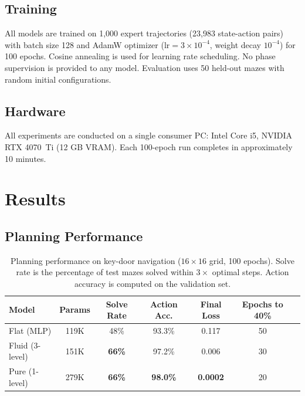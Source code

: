 \documentclass{article}
\begin{document}
\subsection{Training}

All models are trained on 1,000 expert trajectories (23,983 state-action pairs) with batch size 128 and AdamW optimizer ($\text{lr} = 3 \times 10^{-4}$, weight decay $10^{-4}$) for 100 epochs. Cosine annealing is used for learning rate scheduling. No phase supervision is provided to any model. Evaluation uses 50 held-out mazes with random initial configurations.

\subsection{Hardware}

All experiments are conducted on a single consumer PC: Intel Core i5, NVIDIA RTX 4070~Ti (12 GB VRAM). Each 100-epoch run completes in approximately 10 minutes.

\section{Results}
\label{sec:results}

\subsection{Planning Performance}

\begin{table}[h]
\centering
\caption{Planning performance on key-door navigation ($16 \times 16$ grid, 100 epochs). Solve rate is the percentage of test mazes solved within $3\times$ optimal steps. Action accuracy is computed on the validation set.}
\label{tab:main_results}
\begin{tabular}{lcccccc}
\toprule
Model & Params & Solve Rate & Action Acc. & Final Loss & Epochs to 40\% \\
\midrule
Flat (MLP) & 119K & 48\% & 93.3\% & 0.117 & 50 \\
Fluid (3-level) & 151K & \textbf{66\%} & 97.2\% & 0.006 & 30 \\
Pure (1-level) & 279K & \textbf{66\%} & \textbf{98.0\%} & \textbf{0.0002} & 20 \\
\bottomrule
\end{tabular}
\end{table}
\end{document}
